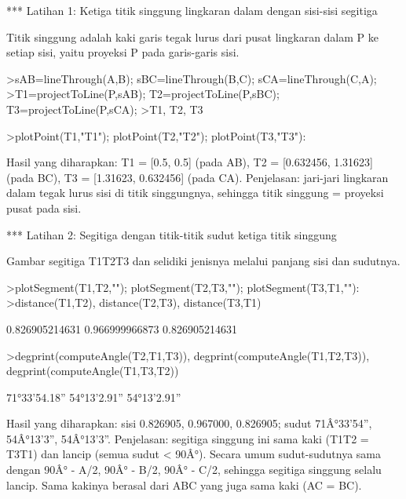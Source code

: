 \documentclass[a4paper,10pt]{article}
\begin{document}
\begin{eulernotebook}
\begin{eulercomment}
\begin{eulercomment}
\begin{eulercomment}
\begin{eulercomment}
\begin{eulercomment}
\end{eulercomment}
\begin{eulercomment}
*** Latihan 1: Ketiga titik singgung lingkaran dalam dengan sisi-sisi segitiga

Titik singgung adalah kaki garis tegak lurus dari pusat lingkaran dalam P ke setiap sisi,
yaitu proyeksi P pada garis-garis sisi.
\end{eulercomment}
\begin{eulerprompt}
>sAB=lineThrough(A,B); sBC=lineThrough(B,C); sCA=lineThrough(C,A);
>T1=projectToLine(P,sAB); T2=projectToLine(P,sBC); T3=projectToLine(P,sCA);
>T1, T2, T3
\end{eulerprompt}
\begin{euleroutput}
  [0.5,  0.5]
  [0.632456,  1.31623]
  [1.31623,  0.632456]
\end{euleroutput}
\begin{eulerprompt}
>plotPoint(T1,"T1"); plotPoint(T2,"T2"); plotPoint(T3,"T3"):
\end{eulerprompt}
\begin{eulercomment}
Hasil yang diharapkan: T1 = [0.5, 0.5] (pada AB), T2 = [0.632456, 1.31623] (pada BC),
T3 = [1.31623, 0.632456] (pada CA).
Penjelasan: jari-jari lingkaran dalam tegak lurus sisi di titik singgungnya, sehingga
titik singgung = proyeksi pusat pada sisi.

*** Latihan 2: Segitiga dengan titik-titik sudut ketiga titik singgung

Gambar segitiga T1T2T3 dan selidiki jenisnya melalui panjang sisi dan sudutnya.
\end{eulercomment}
\begin{eulerprompt}
>plotSegment(T1,T2,""); plotSegment(T2,T3,""); plotSegment(T3,T1,""):
>distance(T1,T2), distance(T2,T3), distance(T3,T1)
\end{eulerprompt}
\begin{euleroutput}
  0.826905214631
  0.966999966873
  0.826905214631
\end{euleroutput}
\begin{eulerprompt}
>degprint(computeAngle(T2,T1,T3)), degprint(computeAngle(T1,T2,T3)), degprint(computeAngle(T1,T3,T2))
\end{eulerprompt}
\begin{euleroutput}
  71°33'54.18''
  54°13'2.91''
  54°13'2.91''
\end{euleroutput}
\begin{eulercomment}
Hasil yang diharapkan: sisi 0.826905, 0.967000, 0.826905; sudut 71Â°33'54'', 54Â°13'3'', 54Â°13'3''.
Penjelasan: segitiga singgung ini sama kaki (T1T2 = T3T1) dan lancip (semua sudut \textless{} 90Â°).
Secara umum sudut-sudutnya sama dengan 90Â° - A/2, 90Â° - B/2, 90Â° - C/2, sehingga segitiga
singgung selalu lancip. Sama kakinya berasal dari ABC yang juga sama kaki (AC = BC).


\end{eulercomment}
\end{eulercomment}
\end{eulercomment}
\end{eulercomment}
\end{eulercomment}
\end{eulernotebook}
\end{document}
